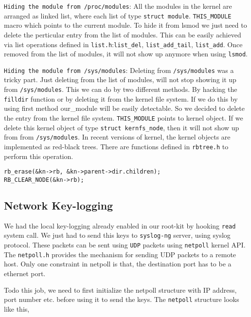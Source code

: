 \documentclass[10pt, letterpaper]{scrartcl}
\begin{document}
\texttt{Hiding the module from /proc/modules}: All the modules in the kernel are arranged as linked list, 
where each list of type \texttt{struct module}. \texttt{THIS\_MODULE} macro which points to the current module. 
To hide it from lsmod we just need to delete the perticular entry from the list of modules. 
This can be easily achieved via list operations defined in \texttt{list.h}:\texttt{list\_del}, 
\texttt{list\_add\_tail}, \texttt{list\_add}. Once removed from the list of modules, 
it will not show up anymore when using \texttt{lsmod}. 

\texttt{Hiding the module from /sys/modules}: Deleting from \texttt{/sys/modules} was a tricky part. 
Just deleting from the list of modules, will not stop showing it up from \texttt{/sys/modules}.
This we can do by two different methods. By hacking the \texttt{filldir} function or by deleting it from the 
kernel file system. If we do this by using first method our\_module will be easily detectable. 
So we decided to delete the entry from the kernel file system. \texttt{THIS\_MODULE} points to kernel object. 
If we delete this kernel object of type \texttt{struct kernfs\_node}, then it will not show up from from \texttt{/sys/modules}. 
In recent versions of kernel, the kernel objects are implemented as red-black trees. 
There are functions defined in \texttt{rbtree.h} to perform this operation. 

\begin{verbatim}
rb_erase(&kn->rb, &kn->parent->dir.children);
RB_CLEAR_NODE(&kn->rb);
\end{verbatim}


\subsection{Network Key-logging}
We had the local key-logging already enabled in our root-kit by hooking \texttt{read} system call. 
We just had to send this keys to \texttt{syslog-ng} server, using syslog protocol. 
These packets can be sent using \texttt{UDP} packets using \texttt{netpoll} kernel API. 
The \texttt{netpoll.h} provides the mechanism for sending UDP packets to a remote host. 
Only one constraint in netpoll is that, the destination port has to be a ethernet port. 

Todo this job, we need to first initialize the netpoll structure with IP address, port number etc. 
before using it to send the keys. 
The \texttt{netpoll} structure looks like this, 
\end{document}
